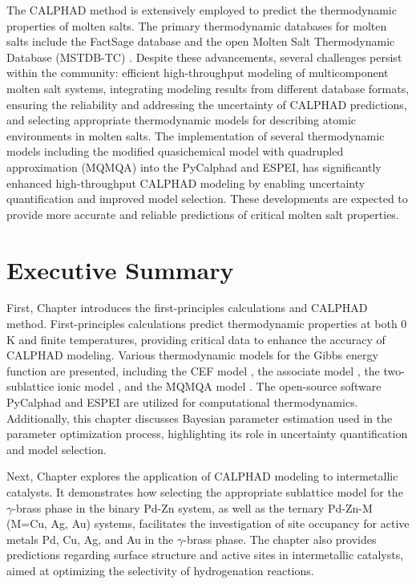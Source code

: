 The CALPHAD method is extensively employed to predict the thermodynamic properties of molten salts. The primary thermodynamic databases for molten salts include the FactSage database \cite{bale2002factsage} and the open Molten Salt Thermodynamic Database (MSTDB-TC) \cite{ard2022development}. Despite these advancements, several challenges persist within the community: efficient high-throughput modeling of multicomponent molten salt systems, integrating modeling results from different database formats, ensuring the reliability and addressing the uncertainty of CALPHAD predictions, and selecting appropriate thermodynamic models for describing atomic environments in molten salts. The implementation of several thermodynamic models including the modified quasichemical model with quadrupled approximation (MQMQA) into the PyCalphad and ESPEI, has significantly enhanced high-throughput CALPHAD modeling by enabling uncertainty quantification and improved model selection. These developments are expected to provide more accurate and reliable predictions of critical molten salt properties.

\section{Executive Summary} \label{intro:sec:summary}
First, Chapter  introduces the first-principles calculations and CALPHAD method. First-principles calculations predict thermodynamic properties at both 0 K and finite temperatures, providing critical data to enhance the accuracy of CALPHAD modeling. Various thermodynamic models for the Gibbs energy function are presented, including the CEF model \cite{hillert1970regular}, the associate model \cite{sommer1982association}, the two-sublattice ionic model \cite{hillert1985two}, and the MQMQA model \cite{pelton2001modified}. The open-source software PyCalphad and ESPEI are utilized for computational thermodynamics. Additionally, this chapter discusses Bayesian parameter estimation used in the parameter optimization process, highlighting its role in uncertainty quantification and model selection.

Next, Chapter  explores the application of CALPHAD modeling to intermetallic catalysts. It demonstrates how selecting the appropriate sublattice model for the $\gamma$-brass phase in the binary Pd-Zn system, as well as the ternary Pd-Zn-M (M=Cu, Ag, Au) systems, facilitates the investigation of site occupancy for active metals Pd, Cu, Ag, and Au in the $\gamma$-brass phase. The chapter also provides predictions regarding surface structure and active sites in intermetallic catalysts, aimed at optimizing the selectivity of hydrogenation reactions.

